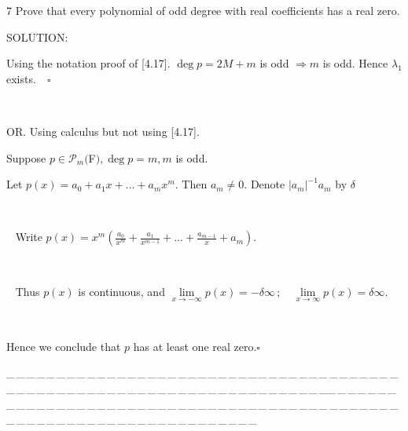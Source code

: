 \documentclass[a4paper, 11pt, UTF8]{article}
\def\Po{\mathcal{P}}
\begin{document}
\begin{large}
{\timesbf\Large 7} {\timessl\Large 
Prove that every polynomial of odd degree with real coefficients has a real zero.
}\par
{\timesbf S\footnotesize{OLUTION:}}\par\quad
Using the notation proof of [4.17]. $\deg p=2M+m$ is odd $\Rightarrow m$ is odd. Hence $\lambda_1$ exists.$\quad\square$\par{\tiny\,\par}\quad
O{\small R.} Using calculus but not using [4.17].\par\quad
Suppose $p\in\Po_m(${\timesbf F}$),\deg p=m,m$ is odd.\par\quad\Large
Let $p(x)=a_0+a_1 x+\dots+a_m x^m.$ Then $a_m\neq 0.$ Denote $|a_m|^{-1}a_m$ by $\delta$\par{\tiny\,\par}\,\,\,
Write $p(x)=x^m(\displaystyle\frac{a_0}{x^m}+\frac{a_1}{x^{m-1}}+\dots+\frac{a_{m-1}}{x}+a_m).$\par{\tiny\,\par}\,\,\,
Thus $p(x)$ is continuous, and $\lim\limits_{x\rightarrow -\infty}p(x)=-\delta\infty\,;\quad\lim\limits_{x\rightarrow \infty}p(x)=\delta\infty.$\par\large{\tiny\,\par}\quad
Hence we conclude that $p$ has at least one real zero.\quad $\square$\par
{\tiny \_\,\_\,\_\,\_\,\_\,\_\,\_\,\_\,\_\,\_\,\_\,\_\,\_\,\_\,\_\,\_\,\_\,\_\,\_\,\_\,\_\,\_\,\_\,\_\,\_\,\_\,\_\,\_\,\_\,\_\,\_\,\_\,\_\,\_\,\_\,\_\,\_\,\_\,\_\,\_\,\_\,\_\,\_\,\_\,\_\,\_\,\_\,\_\,\_\,\_\,\_\,\_\,\_\,\_\,\_\,\_\,\_\,\_\,\_\,\_\,\_\,\_\,\_\,\_\,\_\,\_\,\_\,\_\,\_\,\_\,\_\_\,\_\,\_\,\_\,\_\,\_\,\_\,\_\,\_\,\_\,\_\,\_\,\_\,\_\,\_\,\_\,\_\,\_\,\_\,\_\,\_\,\_\,\_\,\_\,\_\,\_\,\_\,\_\,\_\,\_\,\_\,\_\,\_\,\_\,\_\,\_\,\_\,\_\,\_\,\_\,\_\,\_\,\_\,\_\,\_\,\_\,\_\,\_\,\_\,\_\,\_\,\_\,\_\,\_\,\_\,\_\,\_\,\_\,\_\,\_\,\_\,\_\,\_\,\_\,\_\,\_\,\_\,\_\,\_\,\_\,\_}\par


\end{large}
\end{document}
